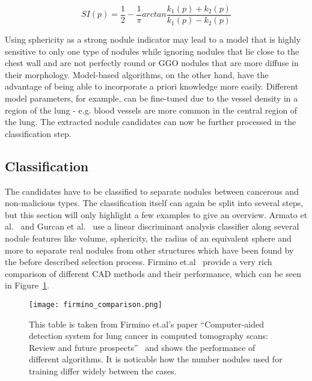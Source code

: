 \documentclass[main.tex]{subfiles}
\begin{document}
\begin{equation} \label{eq:SI}
SI(p)=\frac{1}{2}-\frac{1}{\pi}arctan\frac{k_1(p)+k_2(p)}{k_1(p)-k_2(p)}
\end{equation}

Using sphericity as a strong nodule indicator may lead to a model that is highly sensitive to only one type of nodules while ignoring nodules that lie close to the chest wall and are not perfectly round or GGO nodules that are more diffuse in their morphology. Model-based algorithms, on the other hand, have the advantage of being able to incorporate a priori knowledge more easily. Different model parameters, for example, can be fine-tuned due to the vessel density in a region of the lung - e.g. blood vessels are more common in the central region of the lung. The extracted nodule candidates can now be further processed in the classification step.


\subsection{Classification}
The candidates have to be classified to separate nodules between cancerous and non-malicious types. The classification itself can again be split into several steps, but this section will only highlight a few examples to give an overview. Armato et al.~\cite{armato1999computerized} and Gurcan et al.~\cite{gurcan2002lung} use a linear discriminant analysis classifier along several nodule features like volume, sphericity, the radius of an equivalent sphere and more to separate real nodules from other structures which have been found by the before described selection process. Firmino et.al~\cite{firmino2014computer} provide a very rich comparison of different CAD methods and their performance, which can be seen in Figure~\ref{fig:firmino_comp}.

\begin{figure}[ht]
\centering
\texttt{[image: firmino\_comparison.png]}
\caption{This table is taken from Firmino et.al's paper ``Computer-aided detection system for lung cancer in computed tomography scans: Review and future prospects''~\cite{firmino2014computer} and shows the performance of different algorithms. It is noticable how the number nodules used for training differ widely between the cases.}
\label{fig:firmino_comp}
\end{figure}
\end{document}

